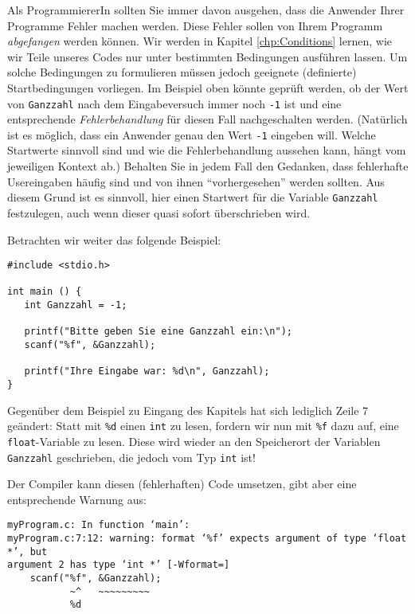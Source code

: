 \begin{hintbox}
Als ProgrammiererIn sollten Sie immer davon ausgehen, dass die Anwender Ihrer Programme Fehler machen werden. Diese Fehler sollen von Ihrem Programm \emph{abgefangen} werden können. Wir werden in Kapitel \ref{chp:Conditions} lernen, wie wir Teile unseres Codes nur unter bestimmten Bedingungen ausführen lassen. Um solche Bedingungen zu formulieren müssen jedoch geeignete (definierte) Startbedingungen vorliegen. Im Beispiel oben könnte geprüft werden, ob der Wert von \texttt{Ganzzahl} nach dem Eingabeversuch immer noch \texttt{-1} ist und eine entsprechende \emph{Fehlerbehandlung} für diesen Fall nachgeschalten werden. (Natürlich ist es möglich, dass ein Anwender genau den Wert \texttt{-1} eingeben will. Welche Startwerte sinnvoll sind und wie die Fehlerbehandlung aussehen kann, hängt vom jeweiligen Kontext ab.) Behalten Sie in jedem Fall den Gedanken, dass fehlerhafte Usereingaben häufig sind und von ihnen \enquote{vorhergesehen} werden sollten. Aus diesem Grund ist es sinnvoll, hier einen Startwert für die Variable \texttt{Ganzzahl} festzulegen, auch wenn dieser quasi sofort überschrieben wird.
\end{hintbox}

Betrachten wir weiter das folgende Beispiel:

\begin{warnbox}[Beispiel: Fehler bei \texttt{scanf}: Falsche Typisierung, leftupper=7mm]
\begin{verbatim}
#include <stdio.h>

int main () {
   int Ganzzahl = -1;
   
   printf("Bitte geben Sie eine Ganzzahl ein:\n");
   scanf("%f", &Ganzzahl);
   
   printf("Ihre Eingabe war: %d\n", Ganzzahl);
}
\end{verbatim}
\end{warnbox}

Gegenüber dem Beispiel zu Eingang des Kapitels hat sich lediglich Zeile 7 geändert: Statt mit \texttt{\%d} einen \texttt{int} zu lesen, fordern wir nun mit \texttt{\%f} dazu auf, eine \texttt{float}-Variable zu lesen. Diese wird wieder an den Speicherort der Variablen \texttt{Ganzzahl} geschrieben, die jedoch vom Typ \texttt{int} ist!

Der Compiler kann diesen (fehlerhaften) Code umsetzen, gibt aber eine entsprechende Warnung aus:

\begin{cmdbox}
\begin{verbatim}
myProgram.c: In function ‘main’:
myProgram.c:7:12: warning: format ‘%f’ expects argument of type ‘float *’, but 
argument 2 has type ‘int *’ [-Wformat=]
    scanf("%f", &Ganzzahl);
           ~^   ~~~~~~~~~
           %d
\end{verbatim}
\end{cmdbox}

